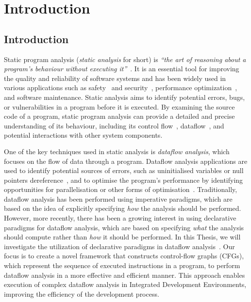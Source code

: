 \chapter{Introduction}
\section{Introduction}

Static program analysis (\emph{static analysis} for short) is 
\emph{``the art of reasoning about a program's behaviour without executing it''}~\cite{spa}.
It is an essential tool for improving the quality and reliability of software
systems and has been widely used in various applications such
as safety~\cite{cousot2005astree,Blanchet2002} and security~\cite{piskachev2021secucheck,flowDroid,ayewah2008using,dura2021javadl,fink2012wala},
performance optimization~\cite{aho2007compilers,appel2004modern}, and software maintenance.
Static analysis aims to identify potential errors, bugs, or vulnerabilities
in a program before it is executed.
By examining the source code of a program, static program 
analysis can provide a detailed and precise understanding of its behaviour, including
its control flow~\cite{allen1970control}, dataflow~\cite{kam1977monotone}, 
and potential interactions with other system components.



One of the key techniques used in static analysis is \emph{dataflow analysis},
which focuses on the flow of data through a program. Dataflow analysis applications are used to identify
potential sources of errors, such as uninitialised variables or null pointers dereference~\cite{riouak2021precise,10.1016/j.scico.2012.02.002}, 
and to optimise the program's performance by identifying opportunities for 
parallelisation or other forms of optimisation~\cite{aho2007compilers}.
Traditionally, dataflow analysis has been performed using imperative paradigms, 
which are based on the idea of explicitly specifying \emph{how} the analysis should be 
performed. 
However, more recently, there has been a growing interest in using 
declarative paradigms for dataflow analysis, which are based on specifying \emph{what}
the analysis should compute rather than \emph{how} it should be performed.
In this Thesis, we will investigate the utilization of declarative paradigms in 
dataflow analysis~\cite{smits2020flowspec,madsen2016programming}. Our focus is to 
create a novel framework that constructs control-flow graphs (CFGs), which represent the 
sequence of executed instructions in a program, to perform dataflow analysis in a 
more effective and efficient manner. This approach enables execution of complex dataflow 
analysis in Integrated Development Environments, improving the efficiency of
the development process.

